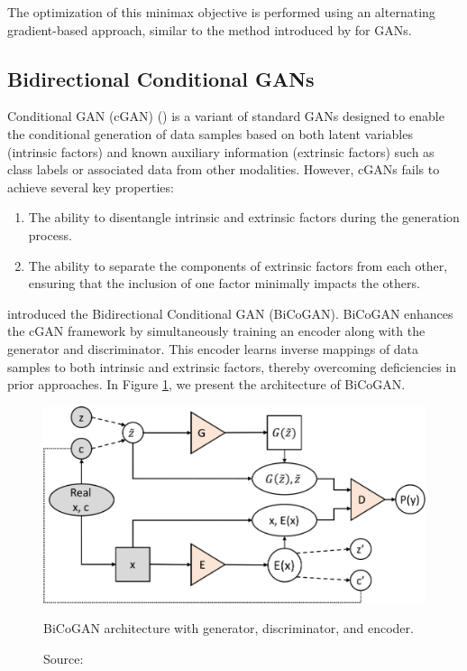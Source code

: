 The optimization of this minimax objective is performed
using an alternating gradient-based approach, similar to the method
introduced by \cite{goodfellow2014} for GANs.

\subsection{Bidirectional Conditional GANs}
\label{sec:bicogan}

Conditional GAN (cGAN) (\cite{mirza2014})
is a variant of standard GANs designed to enable the
conditional generation of data samples based on both latent variables
(intrinsic factors) and known auxiliary information (extrinsic factors)
such as class labels or associated data from other modalities.
However, cGANs fails to achieve several key properties:

\begin{enumerate}
    \item The ability to disentangle intrinsic and extrinsic
    factors during the generation process.
    \item The ability to separate the components of extrinsic
    factors from each other, ensuring that the inclusion of one
    factor minimally impacts the others.
\end{enumerate}

\cite{jaiswal2018} introduced the Bidirectional Conditional GAN (BiCoGAN).
BiCoGAN enhances the cGAN framework by simultaneously training an encoder
along with the generator and discriminator.
This encoder learns inverse mappings of data samples to both intrinsic
and extrinsic factors, thereby overcoming deficiencies in prior approaches.
In Figure \ref{fig:bicogan}, we present the architecture of BiCoGAN.

\begin{figure}[h]
    \centering
    \includegraphics[width=.8\textwidth]{figures/ch3/7.bicogan.jpeg}
    \caption{BiCoGAN architecture with generator, discriminator, and encoder.}
    \vspace{-10px}
    \caption*{\scriptsize{Source: \cite{jaiswal2018}}}
    \label{fig:bicogan}
\end{figure}

